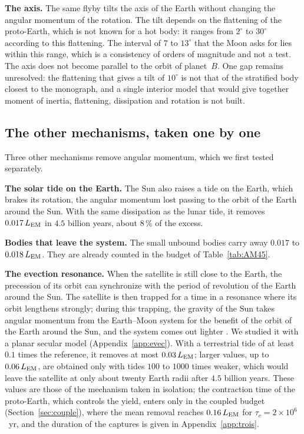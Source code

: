 \documentclass[11pt,a4paper]{article}
\newcommand{\LEM}{\ensuremath{L_{\rm EM}}}
\begin{document}
\textbf{The axis.} The same flyby tilts the axis of the Earth without changing the angular momentum of the rotation. The tilt depends on the flattening of the proto-Earth, which is not known for a hot body: it ranges from $2^\circ$ to $30^\circ$ according to this flattening. The interval of $7$ to $13^\circ$ that the Moon asks for lies within this range, which is a consistency of orders of magnitude and not a test. The axis does not become parallel to the orbit of planet~$B$. One gap remains unresolved: the flattening that gives a tilt of $10^\circ$ is not that of the stratified body closest to the monograph, and a single interior model that would give together moment of inertia, flattening, dissipation and rotation is not built.

\subsection{The other mechanisms, taken one by one}
\label{sec:puits}

Three other mechanisms remove angular momentum, which we first tested separately.

\textbf{The solar tide on the Earth.} The Sun also raises a tide on the Earth, which brakes its rotation, the angular momentum lost passing to the orbit of the Earth around the Sun. With the same dissipation as the lunar tide, it removes $0.017\,\LEM$ in $4.5$ billion years, about $8\,\%$ of the excess.

\textbf{Bodies that leave the system.} The small unbound bodies carry away $0.017$ to $0.018\,\LEM$. They are already counted in the budget of Table~\ref{tab:AM45}.

\textbf{The evection resonance.} When the satellite is still close to the Earth, the precession of its orbit can synchronize with the period of revolution of the Earth around the Sun. The satellite is then trapped for a time in a resonance where its orbit lengthens strongly; during this trapping, the gravity of the Sun takes angular momentum from the Earth--Moon system for the benefit of the orbit of the Earth around the Sun, and the system comes out lighter \citep{CukStewart2012,WardCanupRufu2020,RufuCanup2020}. We studied it with a planar secular model (Appendix~\ref{app:evec}). With a terrestrial tide of at least $0.1$ times the reference, it removes at most $0.03\,\LEM$; larger values, up to $0.06\,\LEM$, are obtained only with tides $100$ to $1000$ times weaker, which would leave the satellite at only about twenty Earth radii after $4.5$ billion years. These values are those of the mechanism taken in isolation; the contraction time of the proto-Earth, which controls the yield, enters only in the coupled budget (Section~\ref{sec:couple}), where the mean removal reaches $0.16\,\LEM$ for $\tau_c=2\times10^6$~yr, and the duration of the captures is given in Appendix~\ref{app:trois}.
\end{document}
